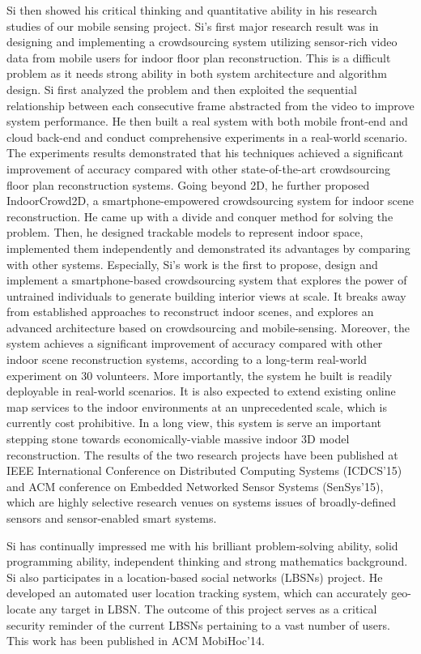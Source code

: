 \documentclass[12pt]{letter} %
\begin{document}
\begin{letter}{}
Si then showed his critical thinking and quantitative ability in his research studies of our mobile sensing project. Si's first major research result was in designing and implementing a crowdsourcing system utilizing sensor-rich video data from mobile users for indoor floor plan reconstruction. This is a difficult problem as it needs strong ability in both system architecture and algorithm design. Si first analyzed the problem and then exploited the sequential relationship between each consecutive frame abstracted from the video to improve system performance. He then built a real system with both mobile front-end and cloud back-end and conduct comprehensive experiments in a real-world scenario. The experiments results demonstrated that his techniques achieved a significant improvement of accuracy compared with other state-of-the-art crowdsourcing floor plan reconstruction systems. Going beyond 2D, he further proposed IndoorCrowd2D, a smartphone-empowered crowdsourcing system for indoor scene reconstruction. He came up with a divide and conquer method for solving the problem. Then, he designed trackable models to represent indoor space, implemented them independently and demonstrated its advantages by comparing with other systems. Especially, Si's work is the first to propose, design and implement a smartphone-based crowdsourcing system that explores the power of untrained individuals to generate building interior views at scale. It breaks away from established approaches to reconstruct indoor scenes, and explores an advanced architecture based on crowdsourcing and mobile-sensing. Moreover, the system achieves a significant improvement of accuracy compared with other indoor scene reconstruction systems, according to a long-term real-world experiment on 30 volunteers. More importantly, the system he built is readily deployable in real-world scenarios. It is also expected to extend existing online map services to the indoor environments at an unprecedented scale, which is currently cost prohibitive. In a long view, this system is serve an important stepping stone towards economically-viable massive indoor 3D model reconstruction. The results of the two research projects have been published at IEEE International Conference on Distributed Computing Systems (ICDCS'15) and ACM conference on Embedded Networked Sensor Systems (SenSys'15), which are highly selective research venues on systems issues of broadly-defined sensors and sensor-enabled smart systems.

Si has continually impressed me with his brilliant problem-solving ability, solid programming ability, independent thinking and strong mathematics background. Si also participates in a location-based social networks (LBSNs) project. He developed an automated user location tracking system, which can accurately geo-locate any target in LBSN. The outcome of this project serves as a critical security reminder of the current LBSNs pertaining to a vast number of users. This work has been published in ACM MobiHoc'14.


\end{letter}
\end{document}
